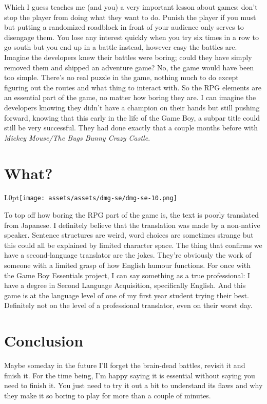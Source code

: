 \documentclass{book}
\begin{document}
\begin{minipage}{0.45\linewidth}\end{minipage}
\par\justifying
Which I guess teaches me (and you) a very important lesson about games: don’t stop the player from doing what they want to do. Punish the player if you must but putting a randomized roadblock in front of your audience only serves to disengage them. You lose any interest quickly when you try six times in a row to go south but you end up in a battle instead, however easy the battles are. Imagine the developers knew their battles were boring; could they have simply removed them and shipped an adventure game? No, the game would have been too simple. There’s no real puzzle in the game, nothing much to do except figuring out the routes and what thing to interact with. So the RPG elements are an essential part of the game, no matter how boring they are. I can imagine the developers knowing they didn’t have a champion on their hands but still pushing forward, knowing that this early in the life of the Game Boy, a subpar title could still be very successful. They had done exactly that a couple months before with \emph{Mickey Mouse/The Bugs Bunny Crazy Castle}.\par
\FloatBarrier\section*{What?}
\begin{wrapfigure}{L}{0pt}{\texttt{[image: assets/assets/dmg-se/dmg-se-10.png]}}\end{wrapfigure}\noindent
To top off how boring the RPG part of the game is, the text is poorly translated from Japanese. I definitely believe that the translation was made by a non-native speaker. Sentence structures are weird, word choices are sometimes strange but this could all be explained by limited character space. The thing that confirms we have a second-language translator are the jokes. They’re obviously the work of someone with a limited grasp of how English humour functions. For once with the Game Boy Essentials project, I can say something as a true professional: I have a degree in Second Language Acquisition, specifically English. And this game is at the language level of one of my first year student trying their best. Definitely not on the level of a professional translator, even on their worst day.\par
\FloatBarrier\section*{Conclusion}
Maybe someday in the future I’ll forget the brain-dead battles, revisit it and finish it. For the time being, I’m happy saying it is essential without saying you need to finish it. You just need to try it out a bit to understand its flaws and why they make it so boring to play for more than a couple of minutes.\par
\end{document}
